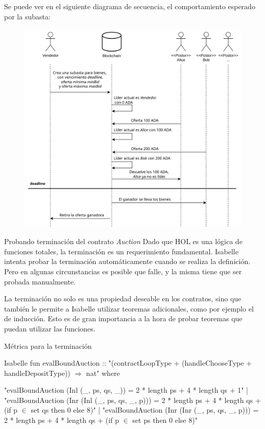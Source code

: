 \documentclass{beamer}
\newcommand{\nologo}{\setbeamertemplate{logo}{}} %
\begin{document}
{\nologo
\begin{frame}

Se puede ver en el siguiente diagrama de secuencia, el comportamiento esperado por la subasta:

\begin{figure}[H]
    \centering
    \includegraphics[height=0.8\textheight]{Auction.png}
\end{figure}

\end{frame}
}

\begin{frame}{Probando terminación del contrato \textit{Auction}}
Dado que HOL es una lógica de funciones totales, la terminación es un requerimiento fundamental. Isabelle intenta probar la terminación automáticamente cuando se realiza la definición. Pero en algunas circunstancias es posible que falle, y la misma tiene que ser probada manualmente.

\bigskip
\pause

La terminación no solo es una propiedad deseable en los contratos, sino que también le permite a Isabelle utilizar teoremas adicionales, como por ejemplo el de inducción. Esto es de gran importancia a la hora de probar teoremas que puedan utilizar las funciones.

\end{frame}

\begin{frame}[fragile]{Métrica para la terminación}
\begin{code}{Isabelle}
fun evalBoundAuction :: "(contractLoopType + (handleChooseType + handleDepositType)) $\Rightarrow$ nat" where

"evalBoundAuction (Inl (_, ps, qs, _)) =
        2 * length ps + 4 * length qs + 1" |
"evalBoundAuction (Inr (Inl (_, ps, qs, _, p))) =
        2 * length ps + 4 * length qs + (if p $\in$ set qs then 0 else 8)" |
"evalBoundAuction (Inr (Inr (_, ps, qs, _, p))) =
        2 * length ps + 4 * length qs + (if p $\in$ set ps then 0 else 8)"
\end{code}

\end{frame}
\end{document}
